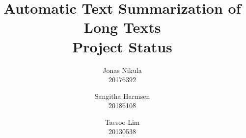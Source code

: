 \documentclass{article}
\title{Automatic Text Summarization of Long Texts \\ Project Status} %
\author{Jonas Nikula \\ 20176392
\and Sangitha Harmsen \\ 20186108
\and Taesoo Lim \\ 20130538} %
\date{} %
\begin{document}
\maketitle %

\begin{abstract}

\end{abstract}

\tableofcontents
\twocolumn





\printbibliography{}

\onecolumn

\end{document}

